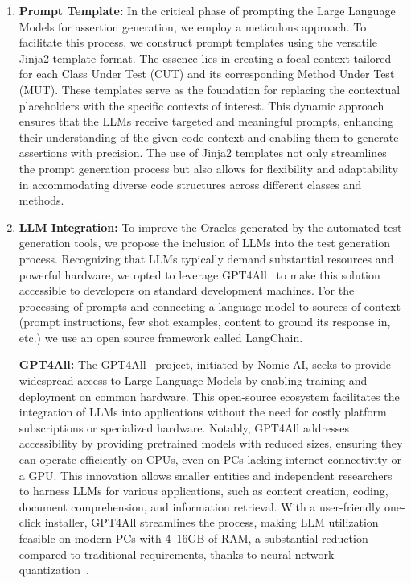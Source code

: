 \begin{enumerate}
    \item \textbf{Prompt Template:} 
    In the critical phase of prompting the Large Language Models for assertion generation, we employ a meticulous approach. To facilitate this process, we construct prompt templates using the versatile Jinja2\cite{noauthor_jinja_nodate} template format. The essence lies in creating a focal context tailored for each Class Under Test (CUT) and its corresponding Method Under Test (MUT). These templates serve as the foundation for replacing the contextual placeholders with the specific contexts of interest. This dynamic approach ensures that the LLMs receive targeted and meaningful prompts, enhancing their understanding of the given code context and enabling them to generate assertions with precision. The use of Jinja2 templates not only streamlines the prompt generation process but also allows for flexibility and adaptability in accommodating diverse code structures across different classes and methods.

    \item \textbf{LLM Integration:} To improve the Oracles generated by the automated test generation tools, we propose the inclusion of LLMs into the test generation process. Recognizing that LLMs typically demand substantial resources and powerful hardware, we opted to leverage GPT4All~\cite{noauthor_gpt4all_nodate} to make this solution accessible to developers on standard development machines. For the processing of prompts and connecting a language model to sources of context (prompt instructions, few shot examples, content to ground its response in, etc.) we use an open source framework called LangChain\cite{langchain}.

    \textbf{GPT4All:} The GPT4All~\cite{noauthor_gpt4all_nodate} project, initiated by Nomic AI, seeks to provide widespread access to Large Language Models by enabling training and deployment on common hardware. This open-source ecosystem facilitates the integration of LLMs into applications without the need for costly platform subscriptions or specialized hardware. Notably, GPT4All addresses accessibility by providing pretrained models with reduced sizes, ensuring they can operate efficiently on CPUs, even on PCs lacking internet connectivity or a GPU. This innovation allows smaller entities and independent researchers to harness LLMs for various applications, such as content creation, coding, document comprehension, and information retrieval. With a user-friendly one-click installer, GPT4All streamlines the process, making LLM utilization feasible on modern PCs with 4–16GB of RAM, a substantial reduction compared to traditional requirements, thanks to neural network quantization~\cite{han_deep_2016}.
    

\end{enumerate}
